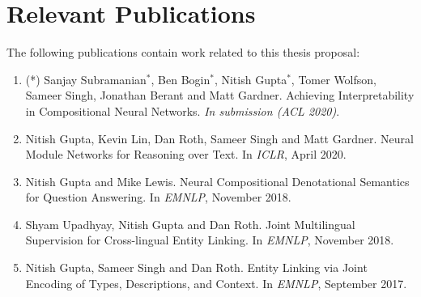 \documentclass{article}
\begin{document}
\section*{Relevant Publications}

The following publications contain work related to this thesis proposal:

\begin{enumerate}


\item (*) Sanjay Subramanian$^{*}$, Ben Bogin$^{*}$, Nitish Gupta$^{*}$, Tomer Wolfson, Sameer Singh, Jonathan Berant and Matt Gardner. Achieving Interpretability in Compositional Neural Networks. \textit{In submission (ACL 2020)}.

\item Nitish Gupta, Kevin Lin, Dan Roth, Sameer Singh and Matt Gardner. Neural Module Networks for Reasoning over Text. In \textit{ICLR}, April 2020.

\item Nitish Gupta and Mike Lewis. Neural Compositional Denotational Semantics for Question Answering. In \textit{EMNLP}, November 2018.

\item Shyam Upadhyay, Nitish Gupta and Dan Roth. Joint Multilingual Supervision for Cross-lingual Entity Linking. In \textit{EMNLP}, November 2018.

\item Nitish Gupta, Sameer Singh and Dan Roth. Entity Linking via Joint Encoding of Types, Descriptions, and Context. In \textit{EMNLP}, September 2017.

\end{enumerate}



\end{document}
